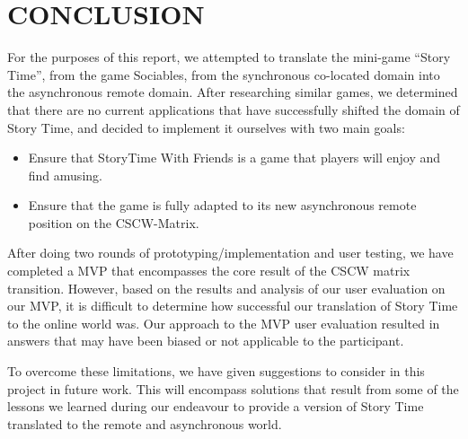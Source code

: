 \documentclass{sigchi}
\begin{document}
\section{CONCLUSION}
For the purposes of this report, we attempted to translate the mini-game ``Story Time'', from the game Sociables, from the synchronous co-located domain into the asynchronous remote domain. After researching similar games, we determined that there are no current applications that have successfully shifted the domain of Story Time, and decided to implement it ourselves with two main goals:
\begin{itemize}[leftmargin=.5in,noitemsep]
\item Ensure that StoryTime With Friends is a game that players will enjoy and find amusing. %
\item Ensure that the game is fully adapted to its new asynchronous remote position on the CSCW-Matrix.
\end{itemize}

After doing two rounds of prototyping/implementation and user testing, we have completed a MVP that encompasses the core result of the CSCW matrix transition. However, based on the results and analysis of our user evaluation on our MVP, it is difficult to determine how successful our translation of Story Time to the online world was. Our approach to the MVP user evaluation resulted in answers that may have been biased or not applicable to the participant.

To overcome these limitations, we have given suggestions to consider in this project in future work. This will encompass solutions that result from some of the lessons we learned during our endeavour to provide a version of Story Time translated to the remote and asynchronous world.









\end{document}
